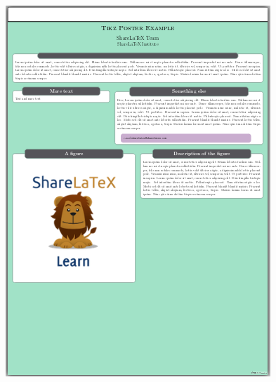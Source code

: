 \documentclass[25pt, a0paper, portrait]{tikzposter}
\begin{document}
\begin{columns}
{\begin{tikzfigure}
	    \includegraphics[width=\linewidth]{Tikzposter_theme/Basic}
	\end{tikzfigure}
    }
    {
	\begin{tikzfigure}

\end{tikzfigure}}
\end{columns}
\end{document}
